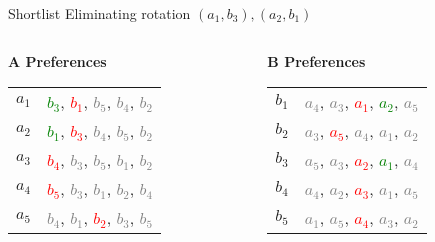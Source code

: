 \documentclass[aspectratio=169,xcolor=dvipsnames]{beamer}
\begin{document}
\begin{frame}{Shortlist}
Eliminating rotation \( (a_1, b_3), (a_2, b_1) \)

\vspace{1em}
\begin{columns}[t]
  \begin{column}{0.45\textwidth}
    \textbf{A Preferences}\\[6pt]
    \begin{tabular}{r@{: }l}
      $a_1$ & \sout{\textcolor{green}{$b_3$}}, \textcolor{red}{$b_1$}, \textcolor{gray}{$b_5$}, \sout{\textcolor{gray}{$b_4$}}, \sout{\textcolor{gray}{$b_2$}} \\
      $a_2$ & \sout{\textcolor{green}{$b_1$}}, \textcolor{red}{$b_3$}, \textcolor{gray}{$b_4$}, \textcolor{gray}{$b_5$}, \sout{\textcolor{gray}{$b_2$}} \\
      $a_3$ & \textcolor{red}{$b_4$}, \textcolor{gray}{$b_3$}, \sout{\textcolor{gray}{$b_5$}}, \textcolor{gray}{$b_1$}, \textcolor{gray}{$b_2$} \\
      $a_4$ & \textcolor{red}{$b_5$}, \sout{\textcolor{gray}{$b_3$}}, \textcolor{gray}{$b_1$}, \sout{\textcolor{gray}{$b_2$}}, \textcolor{gray}{$b_4$} \\
      $a_5$ & \sout{\textcolor{gray}{$b_4$}}, \sout{\textcolor{gray}{$b_1$}}, \textcolor{red}{$b_2$}, \textcolor{gray}{$b_3$}, \textcolor{gray}{$b_5$} \\
    \end{tabular}
  \end{column}

  \begin{column}{0.45\textwidth}
    \textbf{B Preferences}\\[6pt]
    \begin{tabular}{r@{: }l}
      $b_1$ & \textcolor{gray}{$a_4$}, \textcolor{gray}{$a_3$}, \textcolor{red}{$a_1$}, \sout{\textcolor{green}{$a_2$}}, \sout{\textcolor{gray}{$a_5$}} \\
      $b_2$ & \textcolor{gray}{$a_3$}, \textcolor{red}{$a_5$}, \sout{\textcolor{gray}{$a_4$}}, \sout{\textcolor{gray}{$a_1$}}, \sout{\textcolor{gray}{$a_2$}} \\
      $b_3$ & \textcolor{gray}{$a_5$}, \textcolor{gray}{$a_3$}, \textcolor{red}{$a_2$}, \sout{\textcolor{green}{$a_1$}}, \sout{\textcolor{gray}{$a_4$}} \\
      $b_4$ & \textcolor{gray}{$a_4$}, \textcolor{gray}{$a_2$}, \textcolor{red}{$a_3$}, \sout{\textcolor{gray}{$a_1$}}, \sout{\textcolor{gray}{$a_5$}} \\
      $b_5$ & \textcolor{gray}{$a_1$}, \textcolor{gray}{$a_5$}, \textcolor{red}{$a_4$}, \sout{\textcolor{gray}{$a_3$}}, \sout{\textcolor{gray}{$a_2$}} \\
    \end{tabular}
  \end{column}
\end{columns}


\end{frame}
\end{document}
